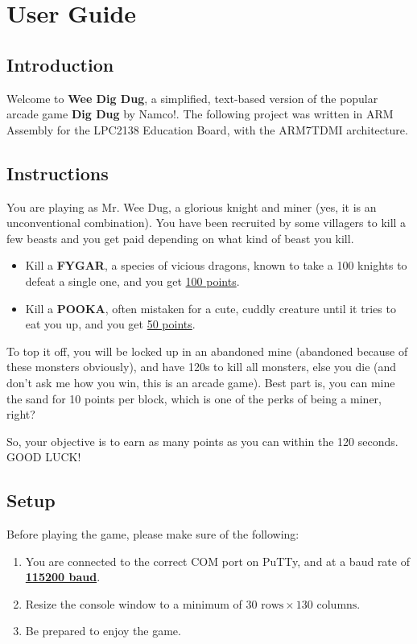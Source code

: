 \section{User Guide}

  \subsection{Introduction}


  \qquad Welcome to \textbf{Wee Dig Dug}, a simplified, text-based version of the popular arcade game \textbf{Dig Dug} by Namco!.
  The following project was written in ARM Assembly for the LPC2138 Education Board, with the ARM7TDMI architecture.

  \subsection{Instructions}
  
  You are playing as Mr. Wee Dug, a glorious knight and miner (yes, it is an unconventional combination).
  You have been recruited by some villagers to kill a few beasts and you get paid depending on what kind of beast you kill.

  \begin{itemize}
    \item Kill a \textbf{FYGAR}, a species of vicious dragons, known to take a 100 knights to defeat a single one, and you get \underline{100 points}.
    \item Kill a \textbf{POOKA}, often mistaken for a cute, cuddly creature until it tries to eat you up, and you get \underline{50 points}.
  \end{itemize}

  To top it off, you will be locked up in an abandoned mine (abandoned because of these monsters obviously), and have 120s to kill all monsters, else you die (and don't ask me how you win, this is an arcade game). Best part is, you can mine the sand for 10 points per block, which is one of the perks of being a miner, right?

  So, your objective is to earn as many points as you can within the 120 seconds. GOOD LUCK!

  \subsection{Setup}

  Before playing the game, please make sure of the following:

  \begin{enumerate} 
    \item You are connected to the correct COM port on PuTTy, and at a baud rate of \textbf{\underline{115200 baud}}.
    \item Resize the console window to a minimum of $ 30 \text{ rows} \times 130 \text{ columns} $.
    \item Be prepared to enjoy the game.
  \end{enumerate}

